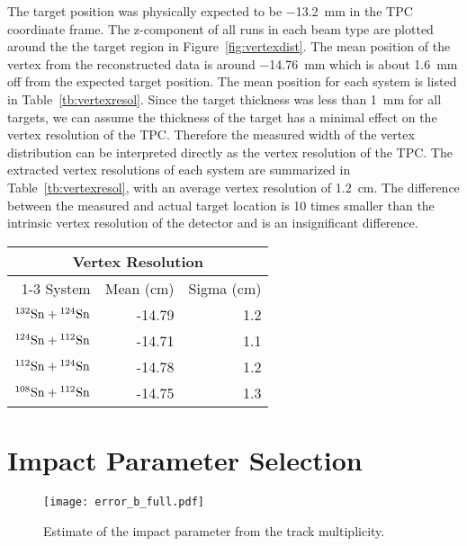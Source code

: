  The target position was physically expected to be \SI{-13.2}{\milli\metre} in the TPC coordinate frame. The z-component of all runs in each beam type are plotted around the the target region in Figure~\ref{fig:vertexdist}. The mean position of the vertex from the reconstructed data is around \SI{-14.76}{\milli\metre} which is about \SI{1.6}{\milli\metre} off from the expected target position. The mean position for each system is listed in Table~\ref{tb:vertexresol}. Since the target thickness was less than \SI{1}{\milli\metre} for all targets, we can assume the thickness of the target has a minimal effect on the vertex resolution of the TPC. Therefore the measured width of the vertex distribution can be interpreted directly as the vertex resolution of the TPC. The extracted vertex resolutions of each system are summarized in Table~\ref{tb:vertexresol}, with an average vertex resolution of \SI{1.2}{\centi\metre}. The difference between the measured and actual target location is 10 times smaller than the intrinsic vertex resolution of the detector and is an insignificant difference.  



\begin{table*}\centering
{}
\begin{tabular}{@{}rrr@{}}\toprule
\multicolumn{3}{c}{Vertex Resolution}\\
\cmidrule{1-3}
System & Mean (cm) & Sigma (cm) \\
\midrule
${}^{132}\mathrm{Sn} + {}^{124}\mathrm{Sn}$ & -14.79  & 1.2 \\
${}^{124}\mathrm{Sn} + {}^{112}\mathrm{Sn}$ & -14.71  & 1.1 \\
${}^{112}\mathrm{Sn} + {}^{124}\mathrm{Sn}$ & -14.78  & 1.2 \\
${}^{108}\mathrm{Sn} + {}^{112}\mathrm{Sn}$ & -14.75  & 1.3 \\ 
\bottomrule
\end{tabular}
\caption{Summary of the mean vertex location for the target position in all systems and the measured vertex resolution.}
\label{tb:vertexresol}
\end{table*}


\clearpage

\section{Impact Parameter Selection}
\label{sec:impact}

\begin{figure}[htb]
\centering
\texttt{[image: error\_b\_full.pdf]}
\caption{Estimate of the impact parameter from the track multiplicity.}
\label{fig:impactPar}
\end{figure}

